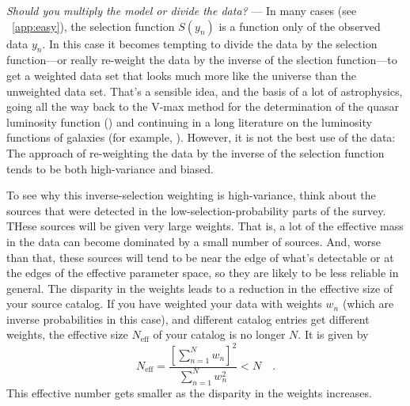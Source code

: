 \documentclass[modern]{aastex62}
\renewcommand{\paragraph}[1]{\medskip\noindent\textit{#1} ---}
\begin{document}
\paragraph{Should you multiply the model or divide the data?}
In many cases (see \appendixname~\ref{app:easy}),
the selection function
$S(y_n)$ is a function only of the observed data $y_n$.
In this case it becomes tempting to divide the data by the selection
function---or really re-weight the data by the inverse of the slection
function---to get a weighted data set that looks much more like the
universe than the unweighted data set.
That's a sensible idea, and the basis of a lot of astrophysics, going
all the way back to the V-max method for the determination of the quasar
luminosity function (\citealt{schmidt}) and continuing in a long literature on the
luminosity functions of galaxies (for example, \citealt{cowie, blanton, faber}).
However, it is not the best use of the data:
The approach of re-weighting the data by the inverse of the
selection function tends to be both high-variance and biased.

To see why this inverse-selection weighting is high-variance, think about
the sources that were detected in the low-selection-probability parts of
the survey.
THese sources will be given very large weights.
That is, a lot of the effective mass in the data can become dominated by
a small number of sources.
And, worse than that, these sources will tend to be near the edge of
what's detectable or at the edges of the effective parameter space, so
they are likely to be less reliable in general.
The disparity in the weights leads to a reduction in the effective size
of your source catalog.
If you have weighted your data with weights $w_n$ (which are inverse
probabilities in this case), and different catalog entries get
different weights, the effective size $N_\mathrm{eff}$ of your catalog
is no longer $N$.
It is given by
\begin{equation}
N_\mathrm{eff} = \frac{\left[\sum_{n=1}^N w_n\right]^2}{\sum_{n=1}^N w_n^2} < N \quad .
\end{equation}
This effective number gets smaller as the disparity in the weights increases.
\end{document}
